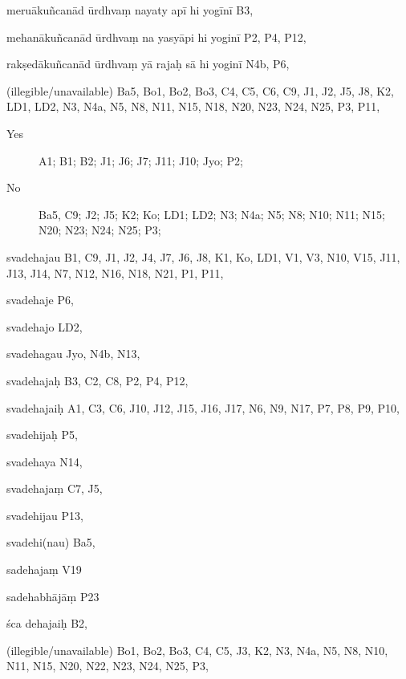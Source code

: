 \begin{marma}[hp03_099*1]
\item[meruākuñcanād ūrdhvaṃ nayaty apī hi yogīnī] B3, 
\item[mehanākuñcanād ūrdhvaṃ na yasyāpi hi yoginī] P2, P4, P12, 
\item[rakṣedākuñcanād ūrdhvaṃ yā rajaḥ sā hi yoginī] N4b, P6, 
\item[(illegible/unavailable)] Ba5, Bo1, Bo2, Bo3, C4, C5, C6, C9, J1, J2, J5, J8, K2, LD1, LD2, N3, N4a, N5, N8, N11, N15, N18, N20, N23, N24, N25, P3, P11, 
  \begin{description}
  \item[Yes] A1; B1; B2; J1; J6; J7; J11; J10; Jyo; P2;
    \item[No] Ba5, C9; J2; J5; K2; Ko; LD1; LD2; N3; N4a; N5; N8; N10; N11; N15; N20; N23; N24; N25; P3;
  \end{description}

\end{marma}

\begin{marma}[hp03_099]


\item[svadehajau] B1, C9, J1, J2, J4, J7, J6, J8, K1, Ko, LD1, V1, V3, N10, V15, J11, J13, J14, N7, N12, N16, N18, N21, P1, P11, 
\item[svadehaje] P6,
\item[svadehajo] LD2,
\item[svadehagau] Jyo, N4b, N13, 
\item[svadehajaḥ] B3, C2, C8, P2, P4, P12, 
\item[svadehajaiḥ] A1, C3, C6, J10, J12, J15, J16, J17, N6, N9, N17, P7, P8, P9, P10, 
\item[svadehijaḥ] P5,
\item[svadehaya] N14,
\item[svadehajaṃ] C7, J5, 
\item[svadehijau] P13,
\item[svadehi(nau)] Ba5,
\item[sadehajaṃ] V19
\item[sadehabhājāṃ] P23
\item[śca dehajaiḥ] B2,
\item[(illegible/unavailable)] Bo1, Bo2, Bo3, C4, C5, J3, K2, N3, N4a, N5, N8, N10, N11, N15, N20, N22, N23, N24, N25, P3,

  \begin{description}
  \end{description}

\end{marma}

